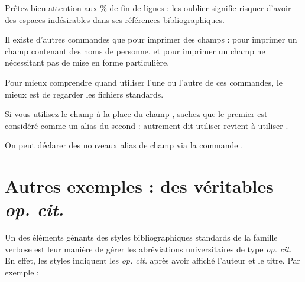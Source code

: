 \begin{latexcode}
\end{latexcode}





Prêtez bien attention aux \% de fin de lignes : les oublier signifie risquer d'avoir des espaces indésirables dans ses références bibliographiques.


\begin{plusloins}

Il  existe d'autres commandes que  pour imprimer des champs :  pour imprimer un champ contenant des noms de personne, et  pour imprimer un champ ne nécessitant pas de mise en forme particulière.

Pour mieux comprendre quand utiliser l'une ou l'autre de ces commandes, le mieux est de regarder les fichiers standards.

\end{plusloins}
\begin{plusloins}
Si vous utilisez le champ  à la place du champ , sachez que le premier est considéré comme un alias du second : autrement dit utiliser  revient à utiliser .

On peut déclarer des nouveaux alias de champ via la commande .
\end{plusloins}

\section{Autres exemples : des véritables \emph{op. cit.}}

Un des éléments gênants des styles bibliographiques standards de la famille verbose est leur manière de gérer les abréviations universitaires de type \emph{op. cit.} En effet, les styles indiquent les \emph{op. cit.} après avoir affiché l'auteur et le titre. Par exemple :

\begin{quotation}
\cite{Urner1952}

\cite{Saxer1980}


\cite{Urner1952}

\cite{Saxer1980}
\end{quotation}

